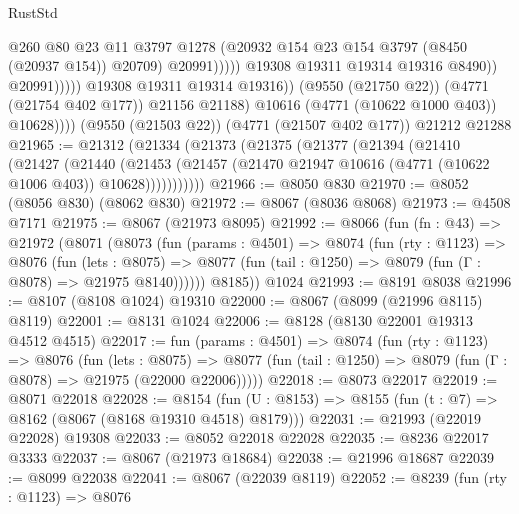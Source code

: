 \begin{lexlean}{RustStd}
\begin{coremodule}
                                          @260
                                          @80
                                          @23
                                          @11
                                          @3797
                                          @1278
                                          (@20932 @154 @23 @154 @3797 (@8450 (@20937 @154)) @20709)
                                          @20991)))))
                                @19308
                                @19311
                                @19314
                                @19316
                                @8490))
                            @20991)))))
                  @19308
                  @19311
                  @19314
                  @19316))
              (@9550 (@21750 @22))
              (@4771 (@21754 @402 @177))
              @21156
              @21188)
            @10616
            (@4771 (@10622 @1000 @403))
            @10628))))
    (@9550 (@21503 @22))
    (@4771 (@21507 @402 @177))
    @21212
    @21288
@21965 := @21312
    (@21334
      (@21373
        (@21375
          (@21377
            (@21394
              (@21410
                (@21427
                  (@21440
                    (@21453
                      (@21457 (@21470 @21947 @10616 (@4771 (@10622 @1006 @403)) @10628)))))))))))
@21966 := @8050 @830
@21970 := @8052 (@8056 @830) (@8062 @830)
@21972 := @8067 (@8036 @8068)
@21973 := @4508 @7171
@21975 := @8067 (@21973 @8095)
@21992 := @8066
    (fun (fn : @43) =>
    @21972
      (@8071
        (@8073
          (fun (params : @4501) =>
          @8074
            (fun (rty : @1123) =>
            @8076
              (fun (lets : @8075) =>
              @8077 (fun (tail : @1250) => @8079 (fun (Γ : @8078) => @21975 @8140))))))
        @8185))
    @1024
@21993 := @8191 @8038
@21996 := @8107 (@8108 @1024) @19310
@22000 := @8067 (@8099 (@21996 @8115) @8119)
@22001 := @8131 @1024
@22006 := @8128 (@8130 @22001 @19313 @4512 @4515)
@22017 := fun (params : @4501) =>
  @8074
    (fun (rty : @1123) =>
    @8076
      (fun (lets : @8075) =>
      @8077 (fun (tail : @1250) => @8079 (fun (Γ : @8078) => @21975 (@22000 @22006)))))
@22018 := @8073 @22017
@22019 := @8071 @22018
@22028 := @8154
    (fun (U : @8153) => @8155 (fun (t : @7) => @8162 (@8067 (@8168 @19310 @4518) @8179)))
@22031 := @21993 (@22019 @22028) @19308
@22033 := @8052 @22018 @22028
@22035 := @8236 @22017 @3333
@22037 := @8067 (@21973 @18684)
@22038 := @21996 @18687
@22039 := @8099 @22038
@22041 := @8067 (@22039 @8119)
@22052 := @8239
    (fun (rty : @1123) =>
    @8076

\end{coremodule}
\end{lexlean}
